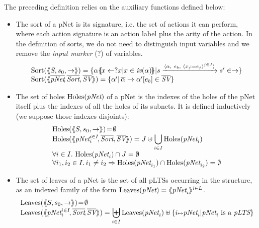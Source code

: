 \documentclass{lncs/llncs}
\begin{document}
The preceding definition relies on the auxiliary functions defined below:

\begin{definition}\label{def-sortholeleave}
  \begin{itemize}
  \item The sort of a pNet is its signature, i.e. the set of actions it can
perform, where each action signature is an action 
label plus the arity of the action. In the definition of sorts, we do not need to 
distinguish
input variables and we remove the
\emph{input marker} (?) of variables.
\[
\begin{array}{l}
\Sortop(\mylangle S,s_0, \to\myrangle) = \{\alpha\subst{x \gets ?x| 
x\in\symb{iv}(\alpha)}|s \xrightarrow{\langle \alpha,~e_b,~(x_j\!:= {e}_j)^{j\in
    J}\rangle} s'\in \to \} \\
\Sortop(\mylangle \overline{\pNet}\!, %
\overline{\Sort},
\overline{\symb{SV}}\myrangle)
=\{\alpha' |\, \SV{\overline{\alpha}}{\alpha'}{e_b}\in\set{\symb{SV}}\}
\end{array}
\]

\item
The set of holes $\Holes(\pNet)$ of a pNet is the indexes of the holes of the pNet 
itself plus the indexes of all the holes of its subnets.
It is defined inductively (we suppose those indexes 
disjoints):
  \[\begin{array}{l}
\Holes(\mylangle S,s_0, \to\myrangle) \!=\! \emptyset\\
\Holes(\mylangle \pNet_i^{i\in I}\!,\overline{\Sort}, \overline{\symb{SV}}\myrangle) 
=J\uplus{\displaystyle \bigcup_{i\in 
I}\Holes(\pNet_i)}\\
\forall i\in I.\, \Holes(\pNet_i)\cap J=\emptyset\\
\forall i_1,i_2\in I.\,i_1\neq i_2\Rightarrow  \Holes(\pNet_{i_1})\cap\Holes(\pNet_{i_2})=\emptyset
\end{array}\]
\item
The set of leaves of a pNet is the set of all pLTSs occurring in the structure, as an 
indexed family of the form $\Leaves(\pNet)= \mylangle \pNet_i \myrangle^{i \in L}$.
\[\begin{array}{l}
\Leaves(\mylangle S,s_0, \to\myrangle) \!=\!\emptyset\\%
\Leaves(\mylangle \pNet_i^{i\in I}\!,%
\overline{\Sort}\!, \overline{\symb{SV}}\myrangle) = {\displaystyle \biguplus_{i\in 
I}\Leaves(\pNet_i)\uplus\{i\mapsto \pNet_i|\pNet_i \text{ is a }\pLTS\}}
\end{array}\]
\end{itemize}
\end{definition}
  
\end{document}
